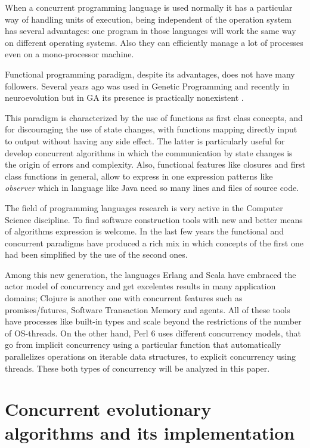 \documentclass[sigconf]{acmart}
\begin{document}
When a concurrent programming language is used normally it has a
particular way of handling units of execution, being independent of
the operation system has several advantages: one program in those
languages will work the same way on different operating systems. Also
they can efficiently manage a lot of processes even on a
mono-processor machine.


Functional programming paradigm, despite its advantages, does not have
many followers. Several years ago was used in Genetic Programming
\cite{Briggs:2008:FGP:1375341.1375345,Huelsbergen:1996:TSE:1595536.1595579,walsh:1999:AFSFESIHLP}
and recently in neuroevolution \cite{Sher2013} but in GA its presence
is practically nonexistent \cite{Hawkins:2001:GFG:872017.872197}. 

This paradigm is characterized by the use of functions as first
class concepts, and for discouraging the use of state changes, with
functions mapping directly input to output without having any side effect. The
latter is particularly useful for develop concurrent algorithms in
which the communication by state changes is the origin of errors and
complexity. Also, functional features like closures and first class
functions in general, allow to express in one expression patterns like
\emph{observer} which in language like Java need so many lines and
files of source code.

The field of programming languages research is very active in the
Computer Science discipline. To find software construction tools with
new and better means of algorithms expression is welcome. In the last
few years the functional and concurrent paradigms have produced a rich
mix in which concepts of the first one had been simplified by the use
of the second ones. 

Among this new generation, the languages Erlang and Scala have
embraced the actor model of concurrency and get excelentes results in
many application domains; Clojure is another one with concurrent
features such as promises/futures, Software Transaction Memory and
agents. All of these tools have processes like built-in types and
scale beyond the restrictions of the number of OS-threads. On the
other hand, Perl 6 \cite{Tang:2007:PRI:1190215.1190218} uses different
concurrency models, that go from implicit concurrency using a
particular function that automatically parallelizes operations on
iterable data structures, to explicit concurrency using threads. These
both types of concurrency will be analyzed in this paper.

\section{Concurrent evolutionary algorithms and its implementation}
\label{sec:impl}
\end{document}
